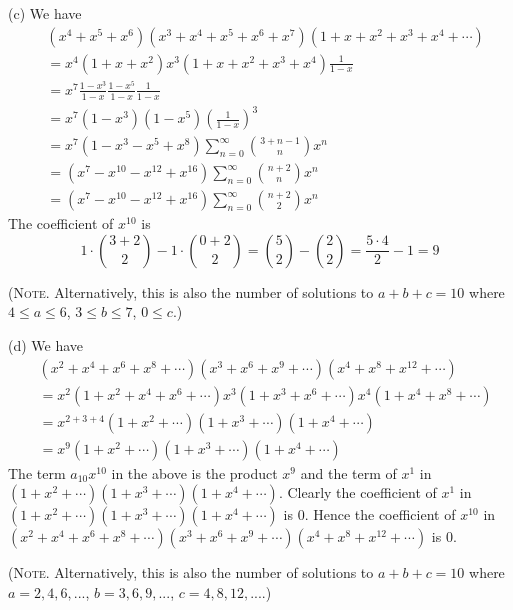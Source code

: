 (c)
We have
\begin{align*}
&(x^4 + x^5 + x^6)(x^3 + x^4 + x^5 + x^6 + x^7)(1 + x + x^2 +
  x^3 + x^4 + \cdots) \\
  &= x^4(1 + x + x^2)x^3(1 + x + x^2 + x^3 + x^4)\frac{1}{1 - x} \\
  &= x^7 \frac{1 - x^3}{1 - x} \frac{1 - x^5}{1 - x} \frac{1}{1 - x} \\
  &= x^7 (1 - x^3)(1 - x^5) \left( \frac{1}{1 - x} \right)^3\\
  &= x^7 (1 - x^3 - x^5 + x^8) \sum_{n=0}^\infty \binom{3 + n - 1}{n} x^n\\
  &= (x^7 - x^{10} - x^{12} + x^{16}) \sum_{n=0}^\infty \binom{n + 2}{n} x^n\\
  &= (x^7 - x^{10} - x^{12} + x^{16}) \sum_{n=0}^\infty \binom{n + 2}{2} x^n
\end{align*}
The coefficient of $x^{10}$ is
\[
1 \cdot \binom{3 + 2}{2} - 1 \cdot \binom{0+2}{2}
= \binom{5}{2} - \binom{2}{2} = \frac{5 \cdot 4}{2} - 1 = 9 
\]

(\textsc{Note.} Alternatively, this is also the number of solutions to
$a + b + c = 10$ where
$4 \leq a \leq 6$,
$3 \leq b \leq 7$,
$0 \leq c$.)

(d)
We have
\begin{align*}
&(x^2 + x^4 + x^6 + x^8 + \cdots)(x^3 + x^6 + x^9 + \cdots)(x^4 +
  x^8 + x^{12} + \cdots) \\
  &= x^2(1 + x^2 + x^4 + x^6 + \cdots)x^3(1 + x^3 + x^6 + \cdots)x^4(1 +
  x^4 + x^{8} + \cdots) \\
  &= x^{2+3+4}(1 + x^2 + \cdots)(1 + x^3 + \cdots)(1 + x^4  + \cdots) \\
  &= x^{9}(1 + x^2 + \cdots)(1 + x^3 + \cdots)(1 + x^4  + \cdots)
\end{align*}
The term $a_{10}x^{10}$ in the above is the product $x^9$ and the
term of $x^1$ in
$(1 + x^2 + \cdots)(1 + x^3 + \cdots)(1 + x^4  + \cdots)$.
Clearly the coefficient of
$x^1$ in $(1 + x^2 + \cdots)(1 + x^3 + \cdots)(1 + x^4  + \cdots)$ is $0$.
Hence the coefficient of $x^{10}$ in 
$(x^2 + x^4 + x^6 + x^8 + \cdots)(x^3 + x^6 + x^9 + \cdots)(x^4 +
x^8 + x^{12} + \cdots)$
is $0$.


(\textsc{Note.} Alternatively, this is also the number of solutions to
$a + b + c = 10$ where
$a=2,4,6,...$,
$b=3,6,9,...$,
$c=4,8,12,...$.)

